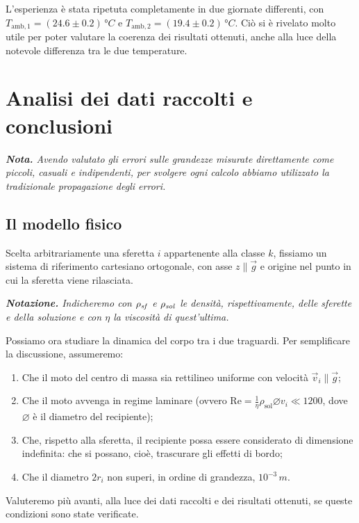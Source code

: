 \documentclass{article}
\newcommand*{\diam}{\varnothing}
\begin{document}
L'esperienza è stata ripetuta completamente in due giornate differenti,
con $T_{\text{amb},1} = (24.6\pm0.2)\,\unit{\degree C}$
e $T_{\text{amb},2} = (19.4\pm0.2)\,\unit{\degree C}$.
Ciò si è rivelato molto utile per poter valutare la
coerenza dei risultati ottenuti, anche alla luce della
notevole differenza tra le due temperature.


\section{Analisi dei dati raccolti e conclusioni}
\emph{\textbf{Nota.}
Avendo valutato gli errori sulle grandezze misurate direttamente
come piccoli, casuali e indipendenti, per svolgere ogni calcolo
abbiamo utilizzato la tradizionale propagazione degli errori.
}

\subsection{Il modello fisico}

Scelta arbitrariamente una sferetta $i$ appartenente alla classe $k$,
fissiamo un sistema di riferimento cartesiano ortogonale, con asse
$z\parallel\vec{g}$ e origine nel punto in cui la sferetta viene rilasciata.

\vspace{2mm}
\emph{
  \textbf{Notazione.} Indicheremo con $\rho_\text{\emph{sf}}$ e
  $\rho_\text{\emph{sol}}$ le densità, rispettivamente, delle sferette
  e della soluzione e con $\eta$ la viscosità di quest'ultima.
}
\vspace{2mm}

Possiamo ora studiare la dinamica del corpo tra i due traguardi.
Per semplificare la discussione, assumeremo:
\begin{enumerate}
  \item Che il moto del centro di massa sia rettilineo uniforme con velocità
    $\vec{v}_i\parallel\vec{g}$;
  \item Che il moto avvenga in regime laminare
    (ovvero $\text{Re}=\frac{1}{\eta}\rho_\text{sol}\diam v_i \ll 1200$,
     dove $\diam$ è il diametro del recipiente);
  \item Che, rispetto alla sferetta, il recipiente possa essere
    considerato di dimensione indefinita: che si possano, cioè,
    trascurare gli effetti di bordo;
  \item Che il diametro $2r_i$ non superi, in ordine di grandezza,
    $10^{-3}\,\unit{m}$.
\end{enumerate}
Valuteremo più avanti, alla luce dei dati raccolti e dei risultati ottenuti,
se queste condizioni sono state verificate.
\end{document}
